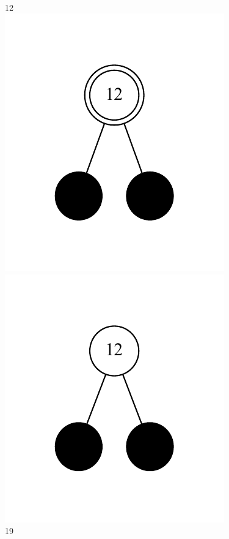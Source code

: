 \documentclass[11pt]{article}
\begin{document}
	\\
	12 \\

\includegraphics{step1.pdf}\\
\includegraphics{step2.pdf}\\
	19 \\
	
\end{document}
